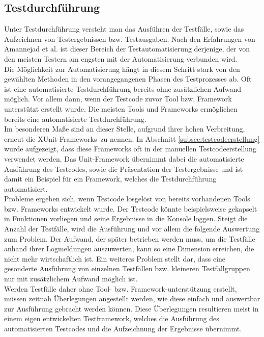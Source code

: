 \subsection{Testdurchführung}
\label{subsec:testdurchführung}
Unter Testdurchführung versteht man das Ausführen der Testfälle, sowie das Aufzeichnen von Testergebnissen bzw. Testausgaben. Nach den Erfahrungen von Amannejad et al. \cite{amannejad_search-based_2014} ist dieser Bereich der Testautomatisierung derjenige, der von den meisten Testern am engsten mit der Automatisierung verbunden wird.\\
Die Möglichkeit zur Automatisierung hängt in diesem Schritt stark von den gewählten Methoden in den vorangegangenen Phasen des Testprozesses ab. Oft ist eine automatisierte Testdurchführung bereits ohne zusätzlichen Aufwand möglich. Vor allem dann, wenn der Testcode zuvor Tool bzw. Framework unterstützt erstellt wurde.
Die meisten Tools und Frameworks ermöglichen bereits eine automatisierte Testdurchführung.\\
Im besonderen Maße sind an dieser Stelle, aufgrund ihrer hohen Verbreitung, erneut die \grq XUnit-Frameworks\grq\ zu nennen.
In Abschnitt \ref{subsec:testcodeerstellung} wurde aufgezeigt, dass diese Frameworks oft in der manuellen Testcodeerstellung verwendet werden. Das Unit-Framework übernimmt dabei die automatisierte Ausführung des Testcodes, sowie die Präsentation der Testergebnisse und ist damit ein Beispiel für ein Framework, welches die Testdurchführung automatisiert.\\
Probleme ergeben sich, wenn Testcode losgelöst von bereits vorhandenen Tools bzw. Frameworks entwickelt wurde. Der Testcode könnte beispielsweise gekapselt in Funktionen vorliegen und seine Ergebnisse in die Konsole loggen. Steigt die Anzahl der Testfälle, wird die Ausführung und vor allem die folgende Auswertung zum Problem. Der Aufwand, der später betrieben werden muss, um die Testfälle anhand ihrer Logmeldungen auszuwerten, kann so eine Dimension erreichen, die nicht mehr wirtschaftlich ist. Ein weiteres Problem stellt dar, dass eine gesonderte Ausführung von einzelnen Testfällen bzw. kleineren Testfallgruppen nur mit zusätzlichem Aufwand möglich ist.\\
Werden Testfälle daher ohne Tool- bzw. Framework-unterstützung erstellt, müssen zeitnah Überlegungen angestellt werden, wie diese einfach und auswertbar zur Ausführung gebracht werden können.
Diese Überlegungen resultieren meist in einem eigen entwickelten Testframework, welches die Ausführung des automatisierten Testcodes und die Aufzeichnung der Ergebnisse übernimmt.



